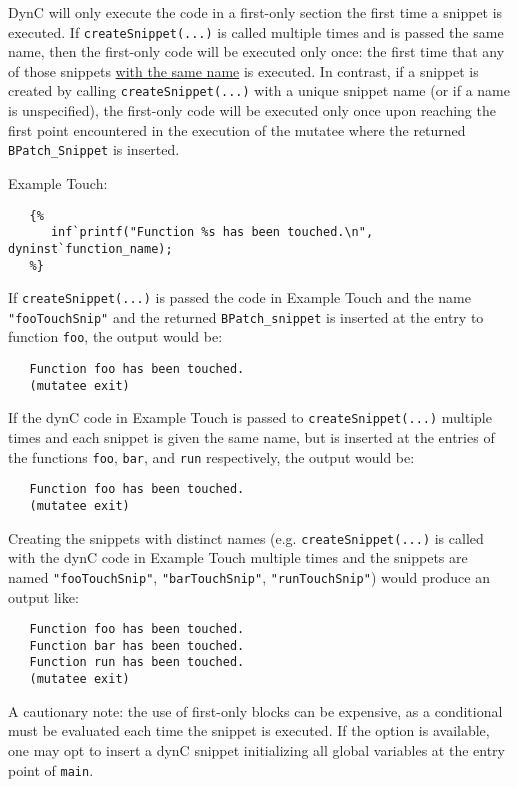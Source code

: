 \documentclass{article}
\begin{document}
DynC will only execute the code in a first-only section the first time a snippet is executed. If \verb!createSnippet(...)! is called multiple times and is passed the same name, then the first-only code will be executed only once: the first time that any of those snippets \underline{with the same name} is executed. In contrast, if a snippet is created by calling \verb!createSnippet(...)! with a unique snippet name (or if a name is unspecified), the first-only code will be executed only once upon reaching the first point encountered in the execution of the mutatee where the returned \verb!BPatch_Snippet! is inserted. 

\noindent Example Touch:
\begin{lstlisting}
   {%
      inf`printf("Function %s has been touched.\n", dyninst`function_name);
   %}
\end{lstlisting}

If \verb!createSnippet(...)! is passed the code in Example Touch and the name \verb!"fooTouchSnip"! and the returned \verb!BPatch_snippet! is inserted at the entry to function \verb!foo!, the output would be:
\begin{lstlisting}
   Function foo has been touched.
   (mutatee exit)
\end{lstlisting}

If the dynC code in Example Touch is passed to \verb!createSnippet(...)! multiple times and each snippet is given the same name, but is inserted at the entries of the functions \verb!foo!, \verb!bar!, and \verb!run! respectively, the output would be:

\begin{lstlisting}
   Function foo has been touched.
   (mutatee exit)
\end{lstlisting}

Creating the snippets with distinct names (e.g. \verb!createSnippet(...)! is called with the dynC code in Example Touch multiple times and the snippets are named \verb!"fooTouchSnip"!, \verb!"barTouchSnip"!, \verb!"runTouchSnip"!) would produce an output like:

\begin{lstlisting}
   Function foo has been touched.
   Function bar has been touched.
   Function run has been touched.
   (mutatee exit)
\end{lstlisting}

A cautionary note: the use of first-only blocks can be expensive, as a conditional must be evaluated each time the snippet is executed. If the option is available, one may opt to insert a dynC snippet initializing all global variables at the entry point of \verb!main!.
\end{document}
